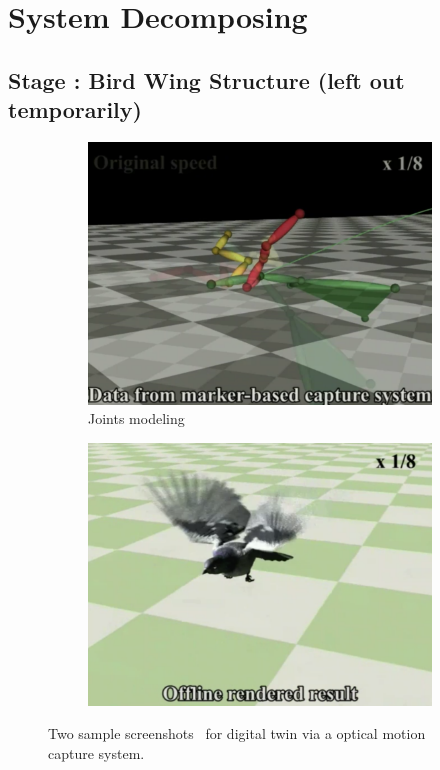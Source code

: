 \documentclass[11pt, a4paper]{article}
\newcounter{mycounter}
\begin{document}
\section{System Decomposing}

\subsection{Stage \themycounter : Bird Wing Structure (left out temporarily)}

\begin{figure}[htbp]
	\centering
		\begin{subfigure}[b]{0.4\textwidth}
			\centering
			\includegraphics[width=\textwidth]{fileForWriting/model_struct}
			\caption{Joints modeling}
			\label{fig:model_struct}
		\end{subfigure}
	\hfill
		\begin{subfigure}[b]{0.4\textwidth}
			\centering
			\includegraphics[width=\textwidth]{fileForWriting/model_real}
			\caption{}
			\label{fig:model_real}
		\end{subfigure}
	\caption{Two sample screenshots~\cite{ju_data-driven_2011} for digital twin via a optical motion capture system.}
	\label{fig:system overview}
\end{figure}
\end{document}
